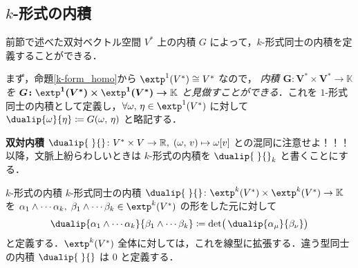 \documentclass[geometry_main]{subfiles}
\begin{document}
\subsection{$k$-形式の内積}

前節で述べた双対ベクトル空間 $V^*$ 上の内積 $G$ によって，$k$-形式同士の内積を定義することができる．

まず，命題\ref{k-form_homo}から $\extp^1(V^*) \cong V^*$ なので，
\emph{内積 $\bm{G \colon V^* \times V^* \to \mathbb{K}}$ を $\bm{G \colon \extp^1(V^*) \times \extp^1(V^*) \to \mathbb{K}}$ と見做すことができる}．これを $1$-形式同士の内積として定義し，$\forall \omega,\, \eta \in \extp^1(V^*)$ に対して $\dualip{\omega}{\eta} \coloneqq G(\omega,\, \eta) $ と略記する．
\begin{marker} 
	\textbf{双対内積} $\dualip{\;}{} \colon V^* \times V \to \mathbb{R},\; (\omega,\, v) \mapsto \omega[v]$ との混同に注意せよ！！！ 以降，文脈上紛らわしいときは $k$-形式の内積を $\dualip{\;}{}_k$ と書くことにする．
\end{marker}


\begin{mydef}[label=def.k-form_inner]{$k$-形式の内積} 
	$k$-形式同士の内積 $\dualip{\;}{} \colon \extp^k(V^*) \times \extp^k(V^*) \to \mathbb{K}$ を
	$\alpha_1 \wedge \cdots \alpha_k,\; \beta_1 \wedge \cdots \beta_k \in \extp^k(V^*)$ の形をした元に対して
	\begin{align} 
		\dualip{\alpha_1 \wedge \cdots \alpha_k}{\beta_1 \wedge \cdots \beta_k} \coloneqq \det \bigl( \, \dualip{\alpha_\mu}{\beta_\nu} \bigr) 
	\end{align}
	と定義する．$\extp^k(V^*)$ 全体に対しては，これを線型に拡張する．違う型同士の内積 $\dualip{\;}{}$ は $0$ と定義する．
\end{mydef}
\end{document}
